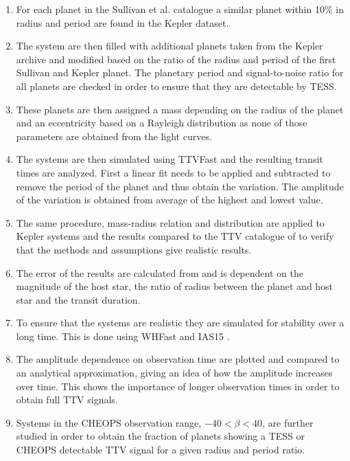 \documentclass[12pt]{report}
\begin{document}
\begin{enumerate}
	\item For each planet in the Sullivan et al. catalogue a similar planet within 10\% in radius and period are found in the Kepler dataset.
	\item The system are then filled with additional planets taken from the Kepler archive and modified based on the ratio of the radius and period of the first Sullivan and Kepler planet. The planetary period and signal-to-noise ratio for all planets are checked in order to ensure that they are detectable by TESS.
	\item These planets are then assigned a mass depending on the radius of the planet \citep{2015ApJ...809...77S} and an eccentricity based on a Rayleigh distribution as none of those parameters are obtained from the light curves.
	\item The systems are then simulated using TTVFast \citep{2014ApJ...787..132D} and the resulting transit times are analyzed. First a linear fit needs to be applied and subtracted to remove the period of the planet and thus obtain the variation. The amplitude of the variation is obtained from average of the highest and lowest value.
	\item The same procedure, mass-radius relation and  distribution are applied to Kepler systems and the results compared to the TTV catalogue of \cite{2018ApJS..234....9O} to verify that the methods and assumptions give realistic results.
	\item The error of the results are calculated from \cite{2005Sci...307.1288H} and is dependent on the magnitude of the host star, the ratio of radius between the planet and host star and the transit duration.
	\item To ensure that the systems are realistic they are simulated for stability over a long time. This is done using WHFast \citep{2015MNRAS.452..376R} and IAS15 \citep{2015MNRAS.446.1424R}.
	\item The amplitude dependence on observation time are plotted and compared to an analytical approximation, giving an idea of how the amplitude increases over time. This shows the importance of longer observation times in order to obtain full TTV signals.
	\item Systems in the CHEOPS observation range, $-40 < \beta < 40$, are further studied in order to obtain the fraction of planets showing a TESS or CHEOPS detectable TTV signal for a given radius and period ratio.
\end{enumerate}
\end{document}
